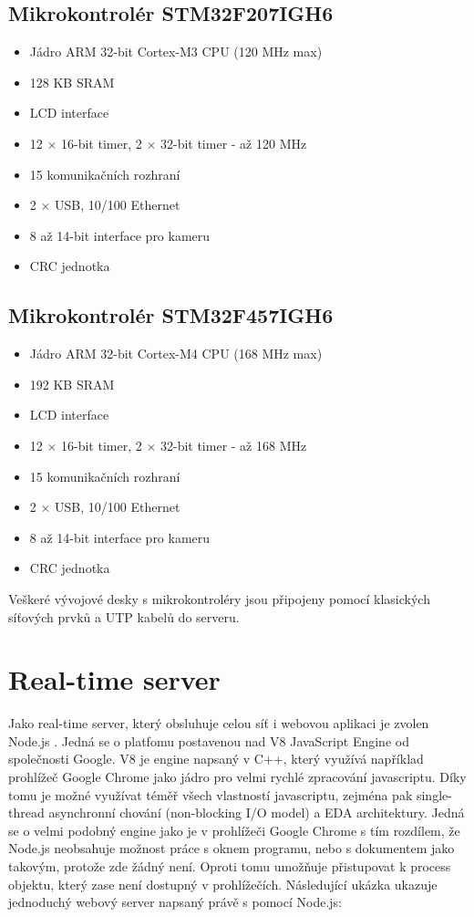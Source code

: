 \subsection{Mikrokontrolér STM32F207IGH6}
\begin{itemize}
\itemsep0em
\item Jádro ARM 32-bit Cortex\texttrademark-M3 CPU (120 MHz max)
\item 128 KB SRAM
\item LCD interface
\item 12 \ensuremath{\times} 16-bit timer, 2 \ensuremath{\times} 32-bit timer - až 120 MHz
\item 15 komunikačních rozhraní
\item 2 \ensuremath{\times} USB, 10/100 Ethernet
\item 8 až 14-bit interface pro kameru
\item CRC jednotka
\end{itemize}

\subsection{Mikrokontrolér STM32F457IGH6}
\begin{itemize}
\itemsep0em
\item Jádro ARM 32-bit Cortex\texttrademark-M4 CPU (168 MHz max)
\item 192 KB SRAM
\item LCD interface
\item 12 \ensuremath{\times} 16-bit timer, 2 \ensuremath{\times} 32-bit timer - až 168 MHz
\item 15 komunikačních rozhraní
\item 2 \ensuremath{\times} USB, 10/100 Ethernet
\item 8 až 14-bit interface pro kameru
\item CRC jednotka
\end{itemize}

Veškeré vývojové desky s mikrokontroléry jsou připojeny pomocí klasických síťových prvků a UTP kabelů do serveru.

\section{Real-time server}
Jako real-time server, který obsluhuje celou síť i webovou aplikaci je zvolen Node.js \cite{nodejs}. Jedná se o platfomu postavenou nad V8 JavaScript Engine od společnosti Google. V8 je engine napsaný v C++, který využívá například prohlížeč Google Chrome jako jádro pro velmi rychlé zpracování javascriptu. Díky tomu je možné využívat téměř všech vlastností javascriptu, zejména pak single-thread asynchronní chování (non-blocking I/O model) a EDA architektury. Jedná se o velmi podobný engine jako je v prohlížeči Google Chrome s tím rozdílem, že Node.js neobsahuje možnost práce s oknem programu, nebo s dokumentem jako takovým, protože zde žádný není. Oproti tomu umožňuje přistupovat k process objektu, který zase není dostupný v prohlížečích. Následující ukázka ukazuje jednoduchý webový server napsaný právě s pomocí Node.js:

